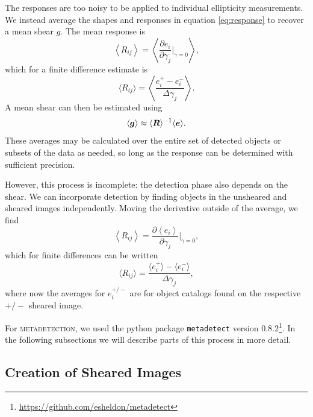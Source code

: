 \documentclass[twocolumn,twocolappendix,astrosym]{openjournal}
\newcommand{\vecg}{\mbox{\boldmath $g$}}
\newcommand{\mdet}{\textsc{metadetection}}
\begin{document}
The responses are too noisy to be applied to individual ellipticity measurements.
We instead average the shapes and responses in equation \ref{eq:response} to
recover a mean shear \vecg.  The mean response is
\begin{equation}
    \left< R_{ij} \right> = \left< \frac{\partial e_i }{\partial \gamma_j } \biggr\rvert_{\gamma=0} \right>,
\end{equation}
which for a finite difference estimate is
\begin{equation}
    \langle R_{ij}\rangle = \left< \frac{e_i^{+} - e_i^{-}}{\Delta\gamma_j} \right>.
\end{equation}
A mean shear can then be estimated using
\begin{equation} \label{eq:shearmeas}
    \langle \vecg \rangle \approx \langle \boldsymbol{R}\rangle^{-1}\langle\boldsymbol{e}\rangle.
\end{equation}
These averages may be calculated over the entire set of detected objects or
subsets of the data as needed, so long as the response can be determined with
sufficient precision.

However, this process is incomplete:  the detection phase also depends on the
shear.  We can incorporate detection by finding objects in the unsheared
and sheared images independently.  Moving the derivative outside of
the average, we find
\begin{equation}
    \left< R_{ij} \right> = \frac{\partial \left< e_i \right> }{\partial \gamma_j } \biggr\rvert_{\gamma=0},
\end{equation}
which for finite differences can be written
\begin{equation} \label{eq:fullR}
    \langle R_{ij}\rangle = \frac{\langle e_i^{+}\rangle - \langle e_i^{-}\rangle}{\Delta\gamma_j},
\end{equation}
where now the averages for $e_i^{+/-}$ are for object catalogs found on the
respective ${+/-}$ sheared image.

For \mdet, we used the python package \texttt{metadetect} version
0.8.2\footnote{\url{https://github.com/esheldon/metadetect}}.  In the
following subsections we will describe parts of this process in more detail.

\subsection{Creation of Sheared Images} \label{sec:mdet:sheared}
\end{document}

